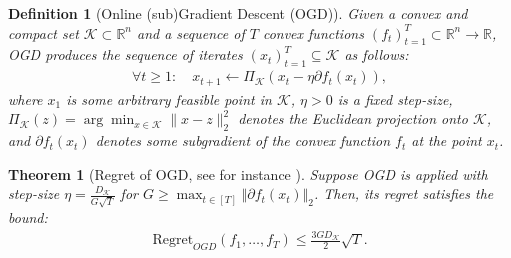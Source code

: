 \documentclass[a4paper,12pt]{article}
\newtheorem{theorem} {Theorem}
\newtheorem{definition} {Definition}
\newcommand{\mK}{\mathcal{K}}
\newcommand{\reals}{\mathbb{R}}
\begin{document}
\begin{definition}[Online (sub)Gradient Descent (OGD)]%
\label{dif:OGD}
Given a convex and compact set $\mK\subset\reals^n$ and a sequence of $T$ convex functions $(f_t)_{t=1}^T\subset\reals^n\rightarrow\reals$, OGD produces the sequence of iterates $(x_t)_{t=1}^T\subseteq\mK$ as follows:
\begin{align*}
\forall t\geq 1: \quad x_{t+1} \gets \Pi_{\mK}(x_t - \eta \partial{}f_t(x_t)),
\end{align*}
where $x_1$ is some arbitrary feasible point in $\mK$, $ \eta > 0 $ is a fixed step-size,  $ \Pi_{\mK}(z) = \arg\min_{x \in \mK} \|x - z\|_2^2 $ denotes the Euclidean projection onto $\mK$, and $\partial{}f_t(x_t)$ denotes some subgradient of the convex function $f_t$ at the point $x_t$.
\end{definition}
\begin{theorem}[Regret of OGD, see for instance \cite{DBLP:journals/corr/abs-1909-05207}] 
\label{theorem:OGD_gar}
Suppose OGD is applied with step-size  $\eta = \frac{D_{\mK}}{G \sqrt{T}}$ for $G \geq \max_{t\in[T]}\Vert{\partial{}f_t(x_t)}\Vert_2$.  Then, its regret satisfies the bound:
\begin{align*}
\text{Regret}_{OGD}(f_1,\dots,f_T) \leq \frac{3GD_{\mK}}{2} \sqrt{T}. %
\end{align*}
\end{theorem}
\end{document}
